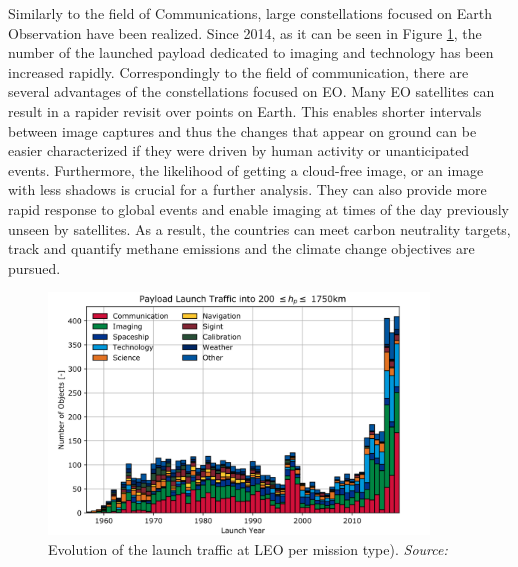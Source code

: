 Similarly to the field of Communications, large constellations focused on Earth Observation have been realized. Since 2014, as it can be seen in Figure \ref{launch_traffic_type_LEO}, the number of the launched payload dedicated to imaging and technology has been increased rapidly. Correspondingly to the field of communication, there are several advantages of the constellations focused on EO. Many EO satellites can result in a rapider revisit over points on Earth. This enables shorter intervals between image captures and thus the changes that appear on ground can be easier characterized if they were driven by human activity or unanticipated events. Furthermore, the likelihood of getting a cloud-free image, or an image with less shadows is crucial for a further analysis. They can also provide more rapid response to global events and enable imaging at times of the day previously unseen by satellites. As a result, the countries can meet carbon neutrality targets, track and quantify methane emissions and the climate change objectives are pursued. \cite{LE_Esteve} %

\begin{figure}
\centering
\includegraphics[width=0.9\textwidth]{Images/launch_traffic_type_LEO.png}\caption{Evolution of the launch traffic at LEO per mission type). \textit{Source: \cite{ESA 2019}}}
\label{launch_traffic_type_LEO} 
\end{figure} 

